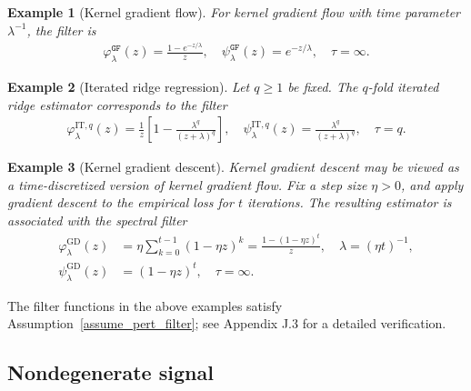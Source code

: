 \documentclass{article}
\theoremstyle{plain}
\newtheorem{example}{Example}
\theoremstyle{definition}
\theoremstyle{remark}
\newcommand{\reg}{\varphi_\lambda}
\newcommand{\rem}{\psi_\lambda}
\newcommand{\mr}{\mathrm}
\newcommand*{\gf}{\mathtt{GF}}
\begin{document}
\begin{example}[Kernel gradient flow]
\label{example:gradient_flow}
For kernel gradient flow with time parameter $\lambda^{-1}$, the filter is
  \begin{align*}
    \reg^{\gf}(z) = \frac{1-e^{-z / \lambda}}{z},\quad \rem^{\gf}(z) = e^{-z / \lambda}, \quad \tau=\infty.
  \end{align*}
\end{example}



\begin{example}[Iterated ridge regression]
  \label{example:IteratedRidge}
  Let $q \geq 1$ be fixed.
  The $q$-fold iterated ridge estimator corresponds to the filter 
  \begin{align*}
    \reg^{\mathrm{IT}, q}(z) = \frac{1}{z}\left[ 1 - \frac{\lambda^q}{(z+\lambda)^q} \right],
    \quad
    \psi^{\mathrm{IT}, q}_\lambda(z) =\frac{\lambda^q}{(z+\lambda)^q},\quad \tau=q.
  \end{align*}
\end{example}





\begin{example}[Kernel gradient descent]
  \label{example:GradientDescent}
  Kernel gradient descent may be viewed as a time-discretized version of kernel gradient flow.
Fix a step size $\eta>0$, and apply gradient descent to the empirical loss for $t$ iterations. 
The resulting estimator is associated with the spectral filter
  \begin{align*}
    \reg^{\mr{GD}}(z) &= \eta \sum_{k=0}^{t-1} (1-\eta z)^{k} = \frac{1-(1-\eta z)^t}{z},\quad \lambda = (\eta t)^{-1}, \\
    \rem^{\mr{GD}}(z) &= (1-\eta z)^t, \quad\tau=\infty.
  \end{align*}
\end{example}



The filter functions in the above examples 
satisfy Assumption~\ref{assume_pert_filter}; see 
Appendix J.3 
for a detailed verification.


\subsection{Nondegenerate signal}


\end{document}
